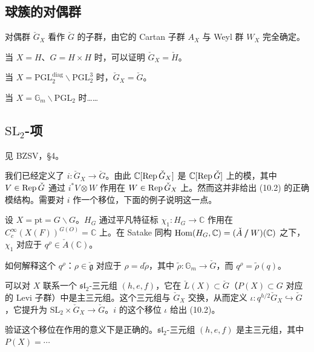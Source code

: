 \subsection{球簇的对偶群}

对偶群 $\check G_X$ 看作 $\check G$ 的子群，由它的 Cartan 子群 $A_X$ 与 Weyl 群 $W_X$ 完全确定。

\begin{exmp}
[群情形]
当 $X=H$、$G=H\times H$ 时，可以证明 $\check G_X=\check H$。
\end{exmp}

\begin{exmp}
当 $X=\mathrm{PGL}_2^{\mathrm{diag}}\backslash\mathrm{PGL}_2^3$ 时，$\check G_X=\check G$。
\end{exmp}

\begin{exmp}
[Hecke]
当 $X=\mathbb G_m\backslash\mathrm{PGL}_2$ 时……
\end{exmp}

\subsection{$\mathrm{SL}_2$-项}

见 BZSV，§4。

我们已经定义了 $i:\check G_X\to\check G$。由此 $\mathbb C[\operatorname{Rep}\check G_X]$ 是 $\mathbb C[\operatorname{Rep}\check G]$ 上的模，其中 $V\in\operatorname{Rep}\check G$ 通过 $i^*V\otimes W$ 作用在 $W\in\operatorname{Rep}\check G_X$ 上。然而这并非给出 (10.2) 的正确模结构。需要对 $i$ 作一个移位，下面的例子说明这一点。

\begin{exmp}
[Whittaker]
设 $X=\mathrm{pt}=G\backslash G$。$H_G$ 通过平凡特征标 $\chi_1:H_G\to\mathbb C$ 作用在 $C_c^\infty(X(F))^{G(O)}=\mathbb C$ 上。在 Satake 同构 $\operatorname{Hom}(H_G,\mathbb C)=(\check A\mathrel{/\mkern-10mu/} W)(\mathbb C)$ 之下，$\chi_1$ 对应于 $q^\rho\in\check A(\mathbb C)$。

如何解释这个 $q^\rho$：$\rho\in\check{\mathfrak g}$ 对应于 $\rho=d\tilde\rho$，其中 $\tilde\rho:\mathbb G_m\to\check G$，而 $q^\rho=\tilde\rho(q)$。

可以对 $X$ 联系一个 $\mathfrak{sl}_2$-三元组 $(h,e,f)$，它在 $\check L(X)\subset\check G$（$P(X)\subset G$ 对应的 Levi 子群）中是主三元组。这个三元组与 $\check G_X$ 交换，从而定义 $\iota:q^{h/2}\check G_X\hookrightarrow\check G$，它提升为 $\mathrm{SL}_2\times\check G_X\to\check G$。$i$ 的这个移位 $\iota$ 给出 (10.2)。
\end{exmp}

\begin{exmp}
[Whittaker]
验证这个移位在作用的意义下是正确的。$\mathfrak{sl}_2$-三元组 $(h,e,f)$ 是主三元组，其中 $P(X)=\cdots$
\end{exmp}

